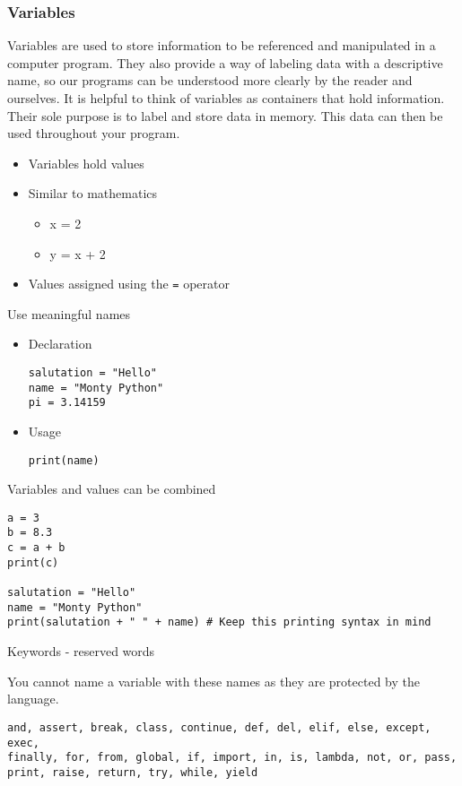\documentclass[10pt, a4paper]{beamer} %
\begin{document}
\begin{frame}\frametitle{Variables}

	Variables are used to store information to be referenced and manipulated in a computer program.
	They also provide a way of labeling data with a descriptive name, so our programs can be understood more clearly by the reader and ourselves.
	It is helpful to think of variables as containers that hold information.
	Their sole purpose is to label and store data in memory.
	This data can then be used throughout your program.

	\begin{itemize}
		\item Variables hold values
		\item Similar to mathematics
		      \begin{itemize}
			      \item x = 2
			      \item y = x + 2
		      \end{itemize}
		\item Values assigned using the \texttt{=} operator
	\end{itemize}
	\begin{examples}
		Use meaningful names
		\begin{itemize}
			\item Declaration
			      \begin{lstlisting}
salutation = "Hello"
name = "Monty Python"
pi = 3.14159
    \end{lstlisting}
			\item Usage
			      \begin{lstlisting}
print(name)
    \end{lstlisting}
		\end{itemize}

	\end{examples}
	\framebreak
	\begin{block}{Variables and values can be combined}
		\begin{lstlisting}
a = 3
b = 8.3
c = a + b
print(c)

salutation = "Hello"
name = "Monty Python"
print(salutation + " " + name) # Keep this printing syntax in mind
    \end{lstlisting}
	\end{block}
	\framebreak
	\begin{block}{Keywords - reserved words}

		You cannot name a variable with these names as they are protected by the language.

		\begin{lstlisting}
and, assert, break, class, continue, def, del, elif, else, except, exec,
finally, for, from, global, if, import, in, is, lambda, not, or, pass,
print, raise, return, try, while, yield
\end{lstlisting}

	\end{block}
\end{frame}
\end{document}
